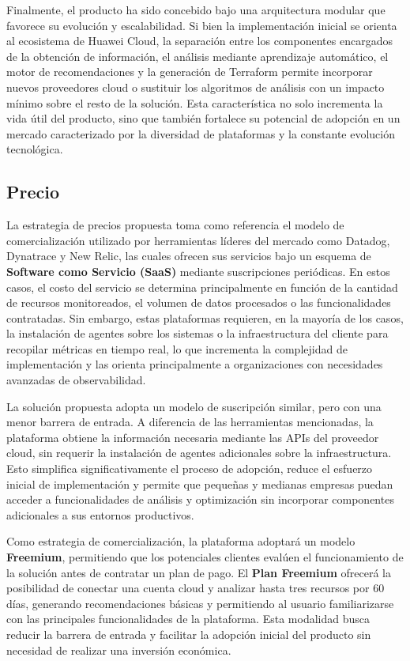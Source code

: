 Finalmente, el producto ha sido concebido bajo una arquitectura modular que favorece su evolución y escalabilidad. Si bien la implementación inicial se orienta al ecosistema de Huawei Cloud, la separación entre los componentes encargados de la obtención de información, el análisis mediante aprendizaje automático, el motor de recomendaciones y la generación de Terraform permite incorporar nuevos proveedores cloud o sustituir los algoritmos de análisis con un impacto mínimo sobre el resto de la solución. Esta característica no solo incrementa la vida útil del producto, sino que también fortalece su potencial de adopción en un mercado caracterizado por la diversidad de plataformas y la constante evolución tecnológica.

\subsection{Precio}

La estrategia de precios propuesta toma como referencia el modelo de comercialización utilizado por herramientas líderes del mercado como Datadog, Dynatrace y New Relic, las cuales ofrecen sus servicios bajo un esquema de \textbf{Software como Servicio (SaaS)} mediante suscripciones periódicas. En estos casos, el costo del servicio se determina principalmente en función de la cantidad de recursos monitoreados, el volumen de datos procesados o las funcionalidades contratadas. Sin embargo, estas plataformas requieren, en la mayoría de los casos, la instalación de agentes sobre los sistemas o la infraestructura del cliente para recopilar métricas en tiempo real, lo que incrementa la complejidad de implementación y las orienta principalmente a organizaciones con necesidades avanzadas de observabilidad.

La solución propuesta adopta un modelo de suscripción similar, pero con una menor barrera de entrada. A diferencia de las herramientas mencionadas, la plataforma obtiene la información necesaria mediante las APIs del proveedor cloud, sin requerir la instalación de agentes adicionales sobre la infraestructura. Esto simplifica significativamente el proceso de adopción, reduce el esfuerzo inicial de implementación y permite que pequeñas y medianas empresas puedan acceder a funcionalidades de análisis y optimización sin incorporar componentes adicionales a sus entornos productivos.

Como estrategia de comercialización, la plataforma adoptará un modelo \textbf{Freemium}, permitiendo que los potenciales clientes evalúen el funcionamiento de la solución antes de contratar un plan de pago. El \textbf{Plan Freemium} ofrecerá la posibilidad de conectar una cuenta cloud y analizar hasta tres recursos por 60 días, generando recomendaciones básicas y permitiendo al usuario familiarizarse con las principales funcionalidades de la plataforma. Esta modalidad busca reducir la barrera de entrada y facilitar la adopción inicial del producto sin necesidad de realizar una inversión económica.


